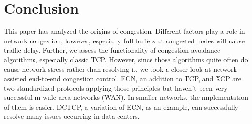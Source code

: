 \documentclass[a4paper,conference]{IEEEtran}
\begin{document}
\section{Conclusion}
This paper has analyzed the origins of congestion. Different factors play a role in network congestion, however, especially full buffers at congested nodes will cause traffic delay. Further, we assess the functionality of congestion avoidance algorithms, especially classic TCP. However, since those algorithms quite often do cause network stress rather than resolving it, we took a closer look at network-assisted end-to-end congestion control. ECN, an addition to TCP, and XCP are two standardized protocols applying those principles but haven't been very successful in wide area networks (WAN). In smaller networks, the implementation of them is easier. DCTCP, a variation of ECN, as an example, can successfully resolve many issues occurring in data centers.


\end{document}
